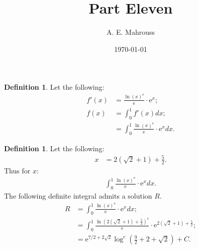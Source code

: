 \documentclass[10pt]{article}
\title{%
	\vspace{-1.5em}%
	\large\textbf{Part Eleven}%
}
\author{A. E. Mahrouss}
\date{\today}
\theoremstyle{plain}
\theoremstyle{definition}
\newtheorem{definition}[theorem]{Definition}
\theoremstyle{remark}
\begin{document}
	
	\begin{definition}
		Let the following:
		\begin{align*}
			f'(x)&= \frac{\ln (x)^{\mathrm{e}}}{\mathrm{e}} \cdot \mathrm{e}^{x};\\
			f(x) &= \int_{0}^{1} f'(x)dx;\\
			&= \int_{0}^{1} \frac{\ln (x)^{\mathrm{e}}}{\mathrm{e}} \cdot \mathrm{e}^{x} dx.
		\end{align*}
	\end{definition}
	
	\begin{definition}
		Let the following:
		\begin{align*}
			x &= 2(\sqrt{2} + 1) + \frac{5}{2}.
		\end{align*}
		Thus for $x$:
		\begin{align*}
			\int_{0}^{1} \frac{\ln (x)^{\mathrm{e}}}{\mathrm{e}} \cdot \mathrm{e}^{x} dx.
		\end{align*}
		The following definite integral admits a solution $R$.
		\begin{align*}
			R &= \int_{0}^{1} \frac{\ln (x)^{\mathrm{e}}}{\mathrm{e}} \cdot \mathrm{e}^{x} dx;\\
			&= \int_{0}^{1} \frac{\ln (2(\sqrt{2} + 1) + \frac{5}{2})^{\mathrm{e}}}{\mathrm{e}} \cdot \mathrm{e}^{2(\sqrt{2} + 1) + \frac{5}{2}};\\
			&= \mathrm{e}^{7/2+2 \sqrt{2}} \log^{e}(\frac{9}{2}+2+\sqrt{2}) + C.
		\end{align*}
	\end{definition}
	
	\nocite{*}
	
	
	
	
\end{document}
